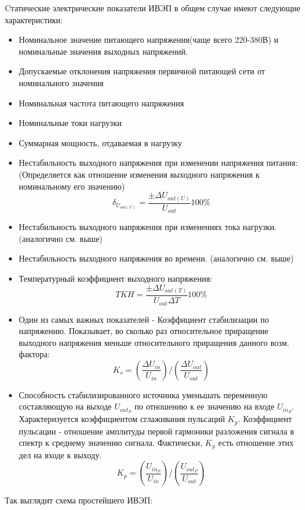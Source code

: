 Cтатические электрические показатели ИВЭП в общем случае имеют следующие характеристики:
\begin{itemize}
\item Номинальное значение питающего напряжения(чаще всего 220-380В) и номинальные значения выходных напряжений. 
\item Допускаемые отклонения напряжения первичной питающей сети от номинального значения
\item Номинальная частота питающего напряжения
\item Номинальные токи нагрузки
\item Суммарная мощность, отдаваемая в нагрузку
\item Нестабильность выходного напряжения при изменении напряжения питания: (Определяется как отношение изменения выходного напряжения к номинальному его значению)
$$
\delta_{U_{out(U)}} = \frac{\pm\Delta U_{out(U)}}{U_{out}}100\%
$$
\item Нестабильность выходного напряжения при изменениях тока нагрузки. (аналогично см. выше)
\item Нестабильность выходного напряжения во времени. (аналогично см. выше)
\item Температурный коэффициент выходного напряжения:
$$
TKH =  \frac{\pm\Delta U_{out(T)}}{U_{out}\Delta T}100\%
$$
\item Один из самых важных показателей - Коэффициент стабилизации по напряжению. Показывает, во сколько раз относительное приращение выходного напряжения меньше относительного приращения данного возм. фактора:
$$
K_s = \left( \frac{\Delta U_{in}}{U_{in}}\right) / \left( \frac{\Delta U_{out}}{U_{out}}\right)
$$
\item Способность стабилизированного источника уменьшать переменную составляющую на выходе $U_{out_P}$ по отношению к ее значению на входе $U_{in_P}$. Характеризуется коэффициентом сглаживания пульсаций $K_p$. Коэффициент пульсации - отношение амплитуды первой гармоники разложения сигнала в спектр к среднему значению сигнала. Фактически, $K_p$ есть отношение этих дел на входе к выходу.
$$
K_p = \left(\frac{U_{in_P}}{U_{in}}\right) / \left( \frac{U_{out_P}}{U_{out}}\right)
$$
\end{itemize}

Так выглядит схема простейшего ИВЭП:
\begin{center}
	\begin{figure}[h!]
		\caption{}
	\end{figure}
\end{center}
\pagebreak

